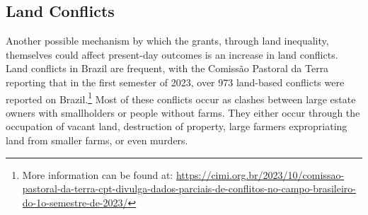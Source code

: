 \documentclass[11pt]{article}
\begin{document}







\subsection{Land Conflicts}

Another possible mechanism by which the grants, through land inequality, themselves could affect present-day outcomes is an increase in land conflicts. 
Land conflicts in Brazil are frequent, with the Comissão Pastoral da Terra reporting that in the first semester of 2023, over 973 land-based conflicts were reported on Brazil.\footnote{More information can be found at: \url{https://cimi.org.br/2023/10/comissao-pastoral-da-terra-cpt-divulga-dados-parciais-de-conflitos-no-campo-brasileiro-do-1o-semestre-de-2023/}}
Most of these conflicts occur as clashes between large estate owners with smallholders or people without farms.
They either occur through the occupation of vacant land, destruction of property, large farmers expropriating land from smaller farms, or even murders. 
\end{document}
